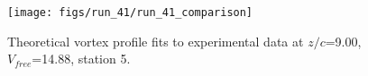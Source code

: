 \begin{figure}[H]
\centering
\texttt{[image: figs/run\_41/run\_41\_comparison]}
\caption{Theoretical vortex profile fits to experimental data at $z/c$=9.00, $V_{free}$=14.88, station 5.}
\label{fig:run_41_comparison}
\end{figure}


